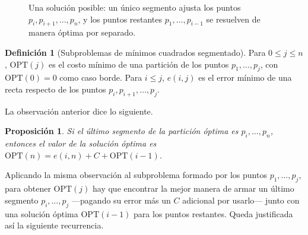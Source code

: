\documentclass[12pt, spanish, oneside, openany]{book}
\theoremstyle{uprightplain}
\newtheorem{proposicion}[teorema]{Proposición}
\theoremstyle{definition}
\newtheorem{definicion}[teorema]{Definición}
\theoremstyle{remark}
\theoremstyle{definition}
\newcommand{\OPT}{\mathrm{OPT}} %
\begin{document}
\begin{figure}[H]
\centering
{}
\caption{Una solución posible: un único segmento ajusta los puntos
$p_i,p_{i+1},\dots,p_n$, y los puntos restantes $p_1,\dots,p_{i-1}$ se
resuelven de manera óptima por separado.}
\label{fig:dp-mcs-ultimo}
\end{figure}

\begin{definicion}[Subproblemas de mínimos cuadrados segmentado]
\label{def:dp-opt-mcs}
Para $0\le j\le n$, $\OPT(j)$ es el costo mínimo de una partición de los puntos $p_1,\dots,p_j$, con $\OPT(0)=0$ como caso borde. Para $i\le j$, $e(i,j)$ es el error mínimo de una recta respecto de los puntos $p_i,p_{i+1},\dots,p_j$.
\end{definicion}

La observación anterior dice lo siguiente.

\begin{proposicion}
\label{prop:dp-mcs-ultimo}
Si el último segmento de la partición óptima es $p_i,\dots,p_n$, entonces el valor de la solución óptima es $\OPT(n)=e(i,n)+C+\OPT(i-1)$.
\end{proposicion}

Aplicando la misma observación al subproblema formado por los puntos $p_1,\dots,p_j$, para obtener $\OPT(j)$ hay que encontrar la mejor manera de armar un último segmento $p_i,\dots,p_j$ ---pagando su error más un $C$ adicional por usarlo--- junto con una solución óptima $\OPT(i-1)$ para los puntos restantes. Queda justificada así la siguiente recurrencia.
\end{document}

